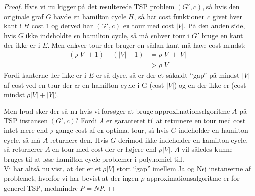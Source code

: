 \begin{proof}
Hvis vi nu kigger på det resulterede TSP problem $(G',c)$, så hvis den originale graf $G$ havde en hamilton cycle $H$, så har cost funktionen $c$ givet hver kant i $H$ cost 1 og derved har $(G',c)$ en tour med cost $|V|$. På den anden side, hvis $G$ ikke indeholdte en hamilton cycle, så må enhver tour i $G'$ bruge en kant der ikke er i $E$. Men enhver tour der bruger en sådan kant må have cost mindst:
\begin{align*}
 (\rho|V|+1)+(|V|-1) &= \rho|V| + |V| \\
		     &> \rho|V|
\end{align*}
Fordi kanterne der ikke er i $E$ er så dyre, så er der et såkaldt ``gap'' på mindst $|V|$ af cost ved en tour der er en hamilton cycle i G (cost $|V|$) og en der ikke er (cost mindst $\rho |V| + |V|$).

Men hvad sker der så nu hvis vi forsøger at bruge approximationsalgoritme $A$ på TSP instansen $(G',c)$? Fordi $A$ er garanteret til at returnere en tour med cost intet mere end $\rho$ gange cost af en optimal tour, så hvis $G$ indeholder en hamilton cycle, så må $A$ returnere den. Hvis $G$ derimod ikke indeholder en hamilton cycle, så returnerer $A$ en tour med cost der er højere end $\rho|V|$. $A$ vil således kunne bruges til at løse hamilton-cycle problemer i polynomiel tid.\\

Vi har altså nu vist, at der er et $\rho|V|$ stort ``gap'' imellem Ja og Nej instanserne af problemet, hvorfor vi har bevist at der ingen $\rho$ approximationsalgoritme er for generel TSP, medmindre $P=NP$.
\end{proof}
